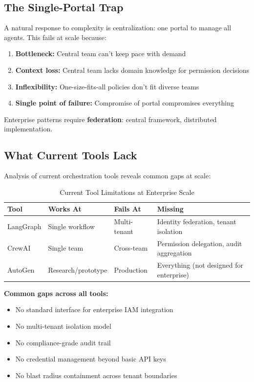 \subsection{The Single-Portal Trap}
\label{subsec:single-portal}

A natural response to complexity is centralization: one portal to manage all agents. This fails at scale because:

\begin{enumerate}
    \item \textbf{Bottleneck:} Central team can't keep pace with demand
    \item \textbf{Context loss:} Central team lacks domain knowledge for permission decisions
    \item \textbf{Inflexibility:} One-size-fits-all policies don't fit diverse teams
    \item \textbf{Single point of failure:} Compromise of portal compromises everything
\end{enumerate}

Enterprise patterns require \textbf{federation}: central framework, distributed implementation.

\subsection{What Current Tools Lack}
\label{subsec:tool-gaps}

Analysis of current orchestration tools reveals common gaps at scale:

\begin{table}[htbp]
\centering
\caption{Current Tool Limitations at Enterprise Scale}
\label{tab:tool-limitations}
\begin{tabular}{llll}
\toprule
\textbf{Tool} & \textbf{Works At} & \textbf{Fails At} & \textbf{Missing} \\
\midrule
LangGraph & Single workflow & Multi-tenant & Identity federation, tenant isolation \\
CrewAI & Single team & Cross-team & Permission delegation, audit aggregation \\
AutoGen & Research/prototype & Production & Everything (not designed for enterprise) \\
\bottomrule
\end{tabular}
\end{table}

\textbf{Common gaps across all tools:}
\begin{itemize}
    \item No standard interface for enterprise IAM integration
    \item No multi-tenant isolation model
    \item No compliance-grade audit trail
    \item No credential management beyond basic API keys
    \item No blast radius containment across tenant boundaries
\end{itemize}

